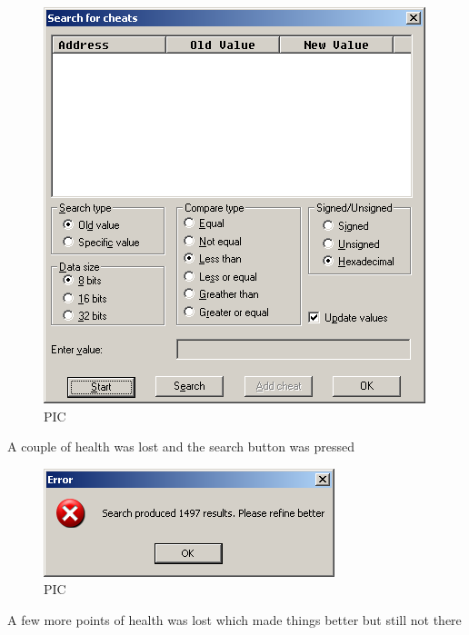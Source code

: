 \documentclass[
]{book}
\begin{document}
\begin{figure}
\centering
\includegraphics{images/202_home_fast6191_romhackingguide_unrenamed_fil___ginal_borders_romhackingguidecheatexample_2.png}
\caption{PIC}
\end{figure}

A couple of health was lost and the search button was pressed

\begin{figure}
\centering
\includegraphics{images/203_home_fast6191_romhackingguide_unrenamed_fil___ginal_borders_romhackingguidecheatexample_3.png}
\caption{PIC}
\end{figure}

A few more points of health was lost which made things better but still not there
\end{document}
